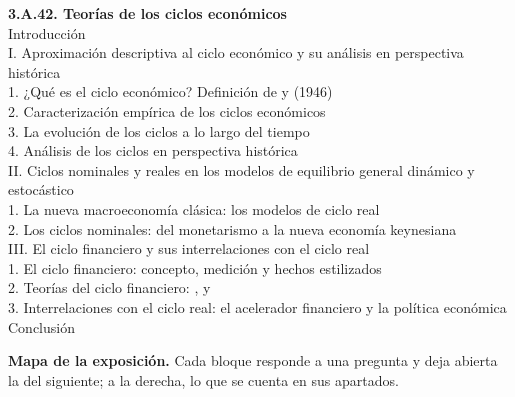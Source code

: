 \documentclass[11pt]{article}
\begin{document}
\begin{esquema}[unbreakable]
\textbf{3.A.42. Teorías de los ciclos económicos}\\[2pt]
Introducción\\
I. Aproximación descriptiva al ciclo económico y su análisis en perspectiva histórica\\
\hspace*{1.5em}1. ¿Qué es el ciclo económico? Definición de  y  (1946)\\
\hspace*{1.5em}2. Caracterización empírica de los ciclos económicos\\
\hspace*{1.5em}3. La evolución de los ciclos a lo largo del tiempo\\
\hspace*{1.5em}4. Análisis de los ciclos en perspectiva histórica\\
II. Ciclos nominales y reales en los modelos de equilibrio general dinámico y estocástico\\
\hspace*{1.5em}1. La nueva macroeconomía clásica: los modelos de ciclo real\\
\hspace*{1.5em}2. Los ciclos nominales: del monetarismo a la nueva economía keynesiana\\
III. El ciclo financiero y sus interrelaciones con el ciclo real\\
\hspace*{1.5em}1. El ciclo financiero: concepto, medición y hechos estilizados\\
\hspace*{1.5em}2. Teorías del ciclo financiero: ,  y \\
\hspace*{1.5em}3. Interrelaciones con el ciclo real: el acelerador financiero y la política económica\\
Conclusión
\end{esquema}

\begin{anotaciones}
\textbf{Mapa de la exposición.} Cada bloque responde a una pregunta y deja abierta la del siguiente; a la derecha, lo que se cuenta en sus apartados.
\begin{infografiacaja}
\caption{Mapa de la exposición: la pregunta de cada bloque y el hilo que los une}\label{figu:mapa-tema}
\end{infografiacaja}
\end{anotaciones}
\end{document}

